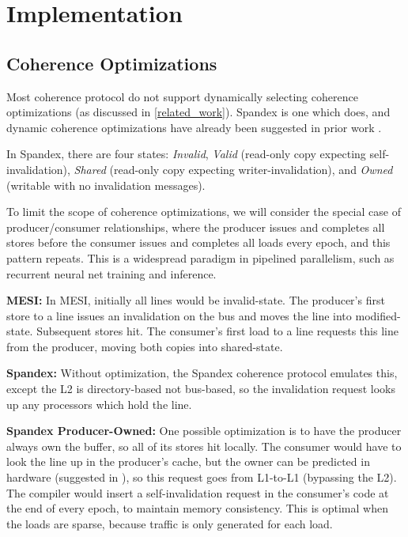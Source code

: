 \section{Implementation}

\subsection{Coherence Optimizations}

Most coherence protocol do not support dynamically selecting coherence optimizations (as discussed in \cref{related_work}).
Spandex \cite{Spandex} is one which does, and dynamic coherence optimizations have already been suggested in prior work \cite{dynamic_cache_coherence}.

In Spandex, there are four states: \textit{Invalid}, \textit{Valid} (read-only copy expecting self-invalidation), \textit{Shared} (read-only copy expecting writer-invalidation), and \textit{Owned} (writable with no invalidation messages).

To limit the scope of coherence optimizations, we will consider the special case of producer/consumer relationships, where the producer issues and completes all stores before the consumer issues and completes all loads every epoch, and this pattern repeats. This is a widespread paradigm in pipelined parallelism, such as recurrent neural net training and inference.

\textbf{MESI:} In MESI, initially all lines would be invalid-state. The producer's first store to a line issues an invalidation on the bus and moves the line into modified-state. Subsequent stores hit. The consumer's first load to a line requests this line from the producer, moving both copies into shared-state.

\textbf{Spandex:} Without optimization, the Spandex coherence protocol emulates this, except the L2 is directory-based not bus-based, so the invalidation request looks up any processors which hold the line.

\textbf{Spandex Producer-Owned:} One possible optimization is to have the producer always own the buffer, so all of its stores hit locally. The consumer would have to look the line up in the producer's cache, but the owner can be predicted in hardware (suggested in \cite{dynamic_cache_coherence}), so this request goes from L1-to-L1 (bypassing the L2).
The compiler would insert a self-invalidation request in the consumer's code at the end of every epoch, to maintain memory consistency.
This is optimal when the loads are sparse, because traffic is only generated for each load.

